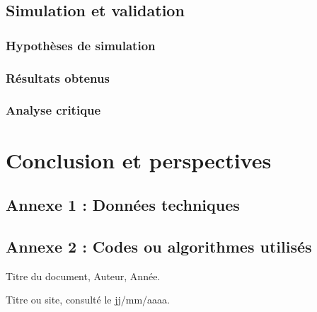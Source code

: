 \documentclass[12pt,a4paper]{report}
\begin{document}


\section{Simulation et validation}

\subsection{Hypothèses de simulation}
\subsection{Résultats obtenus}
\subsection{Analyse critique}



\chapter{Conclusion et perspectives}





\appendix

\section{Annexe 1 : Données techniques}
\section{Annexe 2 : Codes ou algorithmes utilisés}


\begin{thebibliography}{9}

Titre du document, Auteur, Année.


Titre ou site, consulté le jj/mm/aaaa.


\end{thebibliography}
\end{document}
